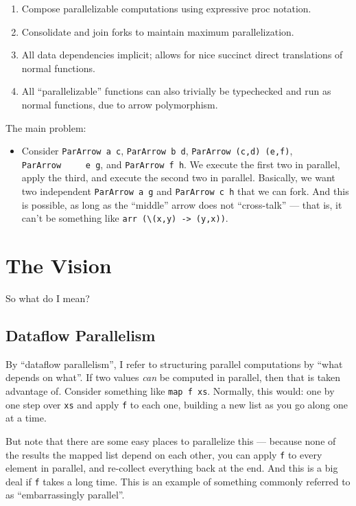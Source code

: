 \documentclass[]{article}
\begin{document}
\begin{enumerate}
\def\labelenumi{\arabic{enumi}.}
\tightlist
\item
  Compose parallelizable computations using expressive proc notation.
\item
  Consolidate and join forks to maintain maximum parallelization.
\item
  All data dependencies implicit; allows for nice succinct direct translations
  of normal functions.
\item
  All ``parallelizable'' functions can also trivially be typechecked and run as
  normal functions, due to arrow polymorphism.
\end{enumerate}

The main problem:

\begin{itemize}
\tightlist
\item
  Consider \texttt{ParArrow\ a\ c}, \texttt{ParArrow\ b\ d},
  \texttt{ParArrow\ (c,d)\ (e,f)}, \texttt{ParArrow\ \ \ \ \ e\ g}, and
  \texttt{ParArrow\ f\ h}. We execute the first two in parallel, apply the
  third, and execute the second two in parallel. Basically, we want two
  independent \texttt{ParArrow\ a\ g} and \texttt{ParArrow\ c\ h} that we can
  fork. And this is possible, as long as the ``middle'' arrow does not
  ``cross-talk'' --- that is, it can't be something like
  \texttt{arr\ (\textbackslash{}(x,y)\ -\textgreater{}\ (y,x))}.
\end{itemize}

\section{The Vision}\label{the-vision}

So what do I mean?

\subsection{Dataflow Parallelism}\label{dataflow-parallelism}

By ``dataflow parallelism'', I refer to structuring parallel computations by
``what depends on what''. If two values \emph{can} be computed in parallel, then
that is taken advantage of. Consider something like \texttt{map\ f\ xs}.
Normally, this would: one by one step over \texttt{xs} and apply \texttt{f} to
each one, building a new list as you go along one at a time.

But note that there are some easy places to parallelize this --- because none of
the results the mapped list depend on each other, you can apply \texttt{f} to
every element in parallel, and re-collect everything back at the end. And this
is a big deal if \texttt{f} takes a long time. This is an example of something
commonly referred to as ``embarrassingly parallel''.
\end{document}
